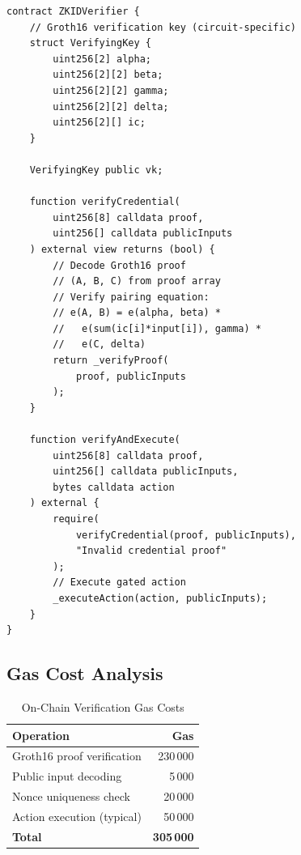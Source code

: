 \documentclass[11pt,a4paper]{article}
\begin{document}
\begin{lstlisting}[language=Solidity,caption={On-Chain ZK-ID Verifier}]
contract ZKIDVerifier {
    // Groth16 verification key (circuit-specific)
    struct VerifyingKey {
        uint256[2] alpha;
        uint256[2][2] beta;
        uint256[2][2] gamma;
        uint256[2][2] delta;
        uint256[2][] ic;
    }

    VerifyingKey public vk;

    function verifyCredential(
        uint256[8] calldata proof,
        uint256[] calldata publicInputs
    ) external view returns (bool) {
        // Decode Groth16 proof
        // (A, B, C) from proof array
        // Verify pairing equation:
        // e(A, B) = e(alpha, beta) *
        //   e(sum(ic[i]*input[i]), gamma) *
        //   e(C, delta)
        return _verifyProof(
            proof, publicInputs
        );
    }

    function verifyAndExecute(
        uint256[8] calldata proof,
        uint256[] calldata publicInputs,
        bytes calldata action
    ) external {
        require(
            verifyCredential(proof, publicInputs),
            "Invalid credential proof"
        );
        // Execute gated action
        _executeAction(action, publicInputs);
    }
}
\end{lstlisting}

\subsection{Gas Cost Analysis}

\begin{table}[h]
\centering
\caption{On-Chain Verification Gas Costs}
\label{tab:gas}
\begin{tabular}{@{}lr@{}}
\toprule
\textbf{Operation} & \textbf{Gas} \\
\midrule
Groth16 proof verification         & 230\,000 \\
Public input decoding               & 5\,000 \\
Nonce uniqueness check              & 20\,000 \\
Action execution (typical)          & 50\,000 \\
\midrule
\textbf{Total}                      & \textbf{305\,000} \\
\bottomrule
\end{tabular}
\end{table}

\end{document}
